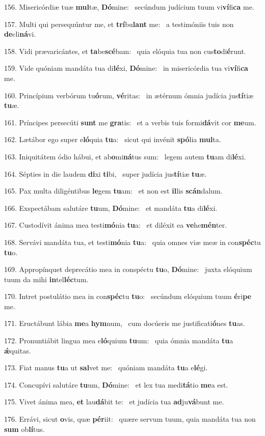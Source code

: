 156. Misericórdiæ tuæ \textbf{mul}tæ, \textbf{Dó}mine: \ast\  secúndum judícium tuum vi\textbf{ví}fi\textbf{ca} me.\

157. Multi qui persequúntur me, et \textbf{trí}bu\textbf{lant} me: \ast\  a testimóniis tuis non \textbf{de}cli\textbf{ná}vi.\

158. Vidi prævaricántes, et \textbf{ta}be\textbf{scé}bam: \ast\  quia elóquia tua non cus\textbf{to}di\textbf{é}runt.\

159. Vide quóniam mandáta tua di\textbf{lé}xi, \textbf{Dó}mine: \ast\  in misericórdia tua vi\textbf{ví}fi\textbf{ca} me.\

160. Princípium verbórum tu\textbf{ó}rum, \textbf{vé}ritas: \ast\  in ætérnum ómnia judícia jus\textbf{tí}tiæ \textbf{tu}æ.\

161. Príncipes persecúti \textbf{sunt} me \textbf{gra}tis: \ast\  et a verbis tuis formi\textbf{dá}vit cor \textbf{me}um.\

162. Lætábor ego super e\textbf{ló}quia \textbf{tu}a: \ast\  sicut qui invénit \textbf{spó}lia \textbf{mul}ta.\

163. Iniquitátem ódio hábui, et ab\textbf{o}mi\textbf{ná}tus sum: \ast\  legem autem \textbf{tu}am di\textbf{lé}xi.\

164. Sépties in die laudem \textbf{di}xi \textbf{ti}bi, \ast\  super judícia jus\textbf{tí}tiæ \textbf{tu}æ.\

165. Pax multa diligéntibus \textbf{le}gem \textbf{tu}am: \ast\  et non est \textbf{il}lis \textbf{scán}dalum.\

166. Exspectábam salutáre \textbf{tu}um, \textbf{Dó}mine: \ast\  et mandáta \textbf{tu}a di\textbf{lé}xi.\

167. Custodívit ánima mea testi\textbf{mó}nia \textbf{tu}a: \ast\  et diléxit ea \textbf{ve}he\textbf{mén}ter.\

168. Servávi mandáta tua, et testi\textbf{mó}nia \textbf{tu}a: \ast\  quia omnes viæ meæ in con\textbf{spéc}tu \textbf{tu}o.\

169. Appropínquet deprecátio mea in conspéctu \textbf{tu}o, \textbf{Dó}mine: \ast\  juxta elóquium tuum da mihi \textbf{in}tel\textbf{léc}tum.\

170. Intret postulátio mea in con\textbf{spéc}tu \textbf{tu}o: \ast\  secúndum elóquium tuum \textbf{é}ri\textbf{pe} me.\

171. Eructábunt lábia \textbf{me}a \textbf{hym}num, \ast\  cum docúeris me justificati\textbf{ó}nes \textbf{tu}as.\

172. Pronuntiábit lingua mea e\textbf{ló}quium \textbf{tu}um: \ast\  quia ómnia mandáta \textbf{tu}a \textbf{ǽ}quitas.\

173. Fiat manus \textbf{tu}a ut \textbf{sal}vet me: \ast\  quóniam mandáta \textbf{tu}a e\textbf{lé}gi.\

174. Concupívi salutáre \textbf{tu}um, \textbf{Dó}mine: \ast\  et lex tua medi\textbf{tá}tio \textbf{me}a est.\

175. Vivet ánima mea, \textbf{et} lau\textbf{dá}bit te: \ast\  et judícia tua \textbf{ad}ju\textbf{vá}bunt me.\

176. Errávi, sicut \textbf{o}vis, quæ \textbf{pér}iit: \ast\  quære servum tuum, quia mandáta tua non \textbf{sum} ob\textbf{lí}tus.\

